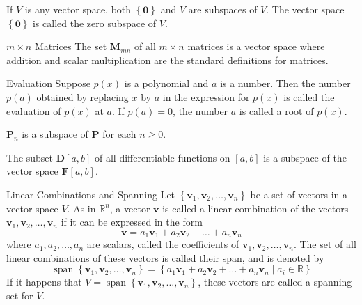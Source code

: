 \documentclass[12pt]{article}
\begin{document}
\begin{note}{}{}
    If $ V $ is any vector space, both $ \left\{ \mathbf{0} \right\} $ and $ V $ are subspaces of $ V $. The vector space $ \left\{ \mathbf{0} \right\} $ is called the zero subspace of $ V $.
\end{note}

\begin{definition}{$ m \times n $ Matrices}{}
    The set $ \mathbf{M}_{mn} $ of all $ m \times n $ matrices is a vector space where addition and scalar multiplication are the standard definitions for matrices.
\end{definition}

\begin{definition}{Evaluation}{}
    Suppose $ p \left( x \right) $ is a polynomial and $ a $ is a number. Then the number $ p \left( a \right) $ obtained by replacing $ x $ by $ a $ in the expression for $ p \left( x \right) $ is called the evaluation of $ p \left( x \right) $ at $ a $. If $ p \left( a \right) = 0 $, the number $ a $ is called a root of $ p \left( x \right) $.
\end{definition}

\begin{theorem}{}{}
    $ \mathbf{P}_n $ is a subspace of $ \mathbf{P} $ for each $ n \geq 0 $.
\end{theorem}

\begin{theorem}{}{}
    The subset $ \mathbf{D} \left[ a, b \right] $ of all differentiable functions on $ \left[ a, b \right] $ is a subspace of the vector space $ \mathbf{F} \left[ a, b \right] $.
\end{theorem}

\begin{definition}{Linear Combinations and Spanning}{}
    Let $ \left\{ \mathbf{v}_1, \mathbf{v}_2, \dots, \mathbf{v}_n \right\} $ be a set of vectors in a vector space $ V $. As in $ \mathbb{R}^n $, a vector $ \mathbf{v} $ is called a linear combination of the vectors $ \mathbf{v}_1, \mathbf{v}_2, \dots, \mathbf{v}_n $ if it can be expressed in the form
    \[ \mathbf{v} = a_1 \mathbf{v}_1 + a_2 \mathbf{v}_2 + \dots + a_n \mathbf{v}_n \]
    where $ a_1, a_2, \dots, a_n $ are scalars, called the coefficients of $ \mathbf{v}_1, \mathbf{v}_2, \dots, \mathbf{v}_n $. The set of all linear combinations of these vectors is called their span, and is denoted by
    \[ \operatorname{span} \left\{ \mathbf{v}_1, \mathbf{v}_2, \dots, \mathbf{v}_n \right\} = \left\{ a_1 \mathbf{v}_1 + a_2 \mathbf{v}_2 + \dots + a_n \mathbf{v}_n \mid a_i \in \mathbb{R} \right\} \]
    If it happens that $ V = \operatorname{span} \left\{ \mathbf{v}_1, \mathbf{v}_2, \dots, \mathbf{v}_n \right\} $, these vectors are called a spanning set for $ V $.
\end{definition}
\end{document}
